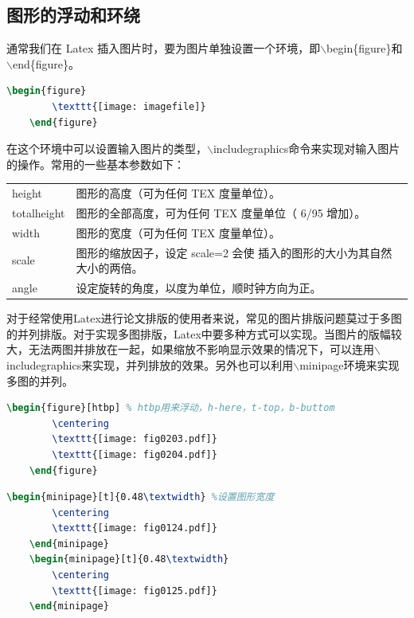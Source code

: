 \documentclass[12pt]{book}
\begin{document}
\subsection{图形的浮动和环绕}

通常我们在 Latex 插入图片时，要为图片单独设置一个环境，即$\backslash$begin\{figure\}和$\backslash$end\{figure\}。
\begin{lstlisting}[language=tex]
	\begin{figure}
		\texttt{[image: imagefile]}
	\end{figure}
\end{lstlisting}

在这个环境中可以设置输入图片的类型，$\backslash$includegraphics命令来实现对输入图片的操作。常用的一些基本参数如下：

\begin{table}[h]
	\centering
	\begin{tabular}{ll}
		height &	图形的高度（可为任何 TEX 度量单位）。\\
		totalheight	& 图形的全部高度，可为任何 TEX 度量单位（ 6/95 增加）。\\
		width &	图形的宽度（可为任何 TEX 度量单位）。\\
		scale	& 图形的缩放因子，设定 scale=2 会使 插入的图形的大小为其自然大小的两倍。\\
		angle &	设定旋转的角度，以度为单位，顺时钟方向为正。\\
	\end{tabular}
\end{table}

对于经常使用Latex进行论文排版的使用者来说，常见的图片排版问题莫过于多图的并列排版。对于实现多图排版，Latex中要多种方式可以实现。当图片的版幅较大，无法两图并排放在一起，如果缩放不影响显示效果的情况下，可以连用$\backslash$includegraphics来实现，并列排放的效果。另外也可以利用$\backslash$minipage环境来实现多图的并列。

\begin{lstlisting}[language=tex,breaklines]
	\begin{figure}[htbp] % htbp用来浮动，h-here，t-top，b-buttom
		\centering
		\texttt{[image: fig0203.pdf]}
		\texttt{[image: fig0204.pdf]}
	\end{figure}
\end{lstlisting}

\begin{lstlisting}[language=tex]
	\begin{minipage}[t]{0.48\textwidth} %设置图形宽度
		\centering
		\texttt{[image: fig0124.pdf]}  
	\end{minipage}
	\begin{minipage}[t]{0.48\textwidth}
		\centering
		\texttt{[image: fig0125.pdf]}  
	\end{minipage}
\end{lstlisting}
\end{document}
